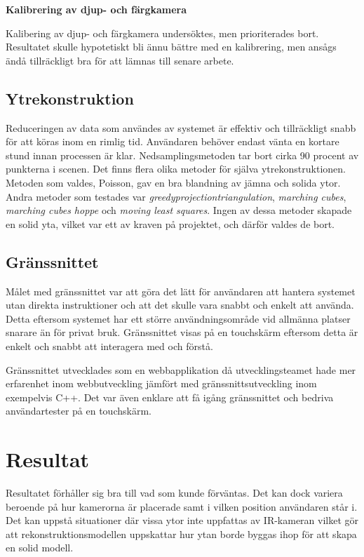 \documentclass[a4paper,12pt,oneside,final]{extbook}
\begin{document}
\textbf{Kalibrering av djup- och färgkamera}

Kalibering av djup- och färgkamera undersöktes, men prioriterades bort. Resultatet skulle hypotetiskt bli ännu bättre med en kalibrering, men ansågs ändå tillräckligt bra för att lämnas till senare arbete.


\subsection{Ytrekonstruktion}
Reduceringen av data som användes av systemet är effektiv och tillräckligt snabb för att köras inom en rimlig tid. Användaren behöver endast vänta en kortare stund innan processen är klar. Nedsamplingsmetoden tar bort cirka 90 procent av punkterna i scenen. Det finns flera olika metoder för själva ytrekonstruktionen. Metoden som valdes, Poisson, gav en bra blandning av jämna och solida ytor. Andra metoder som testades var \emph{greedyprojectiontriangulation}, \emph{marching cubes}, \emph{marching cubes hoppe}  och \emph{moving least squares}. Ingen av dessa metoder skapade en solid yta, vilket var ett av kraven på projektet, och därför valdes de bort.


\subsection{Gränssnittet}
Målet med gränssnittet var att göra det lätt för användaren att hantera systemet utan direkta instruktioner och att det skulle vara snabbt och enkelt att använda. Detta eftersom systemet har ett större användningsområde vid allmänna platser snarare än för privat bruk. Gränssnittet visas på en touchskärm eftersom detta är enkelt och snabbt att interagera med och förstå.

Gränssnittet utvecklades som en webbapplikation då utvecklingsteamet hade mer erfarenhet inom webbutveckling jämfört med gränssnittsutveckling inom exempelvis C++. Det var även enklare att få igång gränssnittet och bedriva användartester på en touchskärm.


\section{Resultat}
Resultatet förhåller sig bra till vad som kunde förväntas. Det kan dock variera beroende på hur kamerorna är placerade samt i vilken position användaren står i. Det kan uppstå situationer där vissa ytor inte uppfattas av IR-kameran vilket gör att rekonstruktionsmodellen uppskattar hur ytan borde byggas ihop för att skapa en solid modell.
\end{document}
